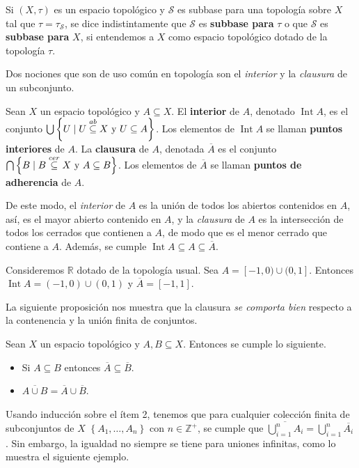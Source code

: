 \begin{Obs}
   Si $(X,\tau)$ es un espacio topológico y $\mathcal{S}$ es subbase para una topología sobre $X$ tal que $\tau=\tau_\mathcal{S}$, se dice indistintamente que $\mathcal{S}$ es \textbf{subbase para} $\tau$ o que $\mathcal{S}$ es \textbf{subbase para} $X$, si entendemos a $X$ como espacio topológico dotado de la topología $\tau$.
\end{Obs}
Dos nociones que son de uso común en topología son el \textit{interior} y la \textit{clausura} de un subconjunto.
\begin{Def}\label{Def:Int_Cl}
   Sean $X$ un espacio topológico y $A\subseteq X$. El \textbf{interior} de $A$, denotado $\operatorname{Int} A$, es el conjunto $\bigcup \left\lbrace U\mid U\stackrel{ab}{\subseteq} X \text{ y } U\subseteq A \right\rbrace$. Los elementos de $\operatorname{Int}A$ se llaman \textbf{puntos interiores} de $A$. La \textbf{clausura} de $A$, denotada $\overline{A}$ es el conjunto \\$\bigcap \left\lbrace B \mid B\stackrel{cer}{\subseteq} X \text{ y } A\subseteq B\right\rbrace$. Los elementos de $\overline{A}$ se llaman \textbf{puntos de adherencia} de $A$.
\end{Def}
De este modo, el \textit{interior} de $A$ es la unión de todos los abiertos contenidos en $A$, así, es el mayor abierto contenido en $A$, y la \textit{clausura} de $A$ es la intersección de todos los cerrados que contienen a $A$, de modo que es el menor cerrado que contiene a $A$. Además, se cumple $\operatorname{Int} A\subseteq A\subseteq \overline{A}$. 
\begin{Ejm}
   Consideremos $\mathbb{R}$ dotado de la topología usual. Sea $A=[-1,0)\cup(0,1]$. Entonces $\operatorname{Int}A=(-1,0)\cup (0,1)$ y $\overline{A}=[-1,1]$. 
\end{Ejm}
La siguiente proposición nos muestra que la clausura \textit{se comporta bien} respecto a la contenencia y la unión finita de conjuntos.
\begin{Prop}\label{Prop:Contenencia_Clausura}
   Sean $X$ un espacio topológico y $A,B\subseteq X$. Entonces se cumple lo siguiente.
   \begin{itemize}
      \item[1.] Si $A\subseteq B$ entonces $\overline{A}\subseteq\overline{B}$.
      \item[2.] $\overline{A\cup B}=\overline{A}\cup\overline{B}$.
   \end{itemize}
\end{Prop}
Usando inducción sobre el ítem 2, tenemos que para cualquier colección finita de subconjuntos de $X$ $\left\lbrace A_1,\dots,A_n\right\rbrace$ con $n\in\mathbb{Z}^+$, se cumple que $\overline{\bigcup_{i=1}^{n}A_i}=\bigcup_{i=1}^{n}\overline{A_i}$. Sin embargo, la igualdad no siempre se tiene para uniones infinitas, como lo muestra el siguiente ejemplo.
